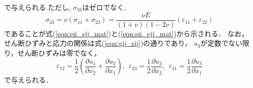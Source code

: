 \documentclass[10pt,a4j]{jbook}
\begin{document}
で与えられる.ただし, $\sigma_{33}$はゼロでなく,
\begin{equation}
	\sigma_{33}
	=\nu \left(\sigma_{11}+\sigma_{22}\right)
	=\frac{\nu E}{(1+\nu)(1-2\nu)}\left(\varepsilon_{11}+\varepsilon_{22}\right)
	\label{eqn:s33_pstrain}
\end{equation}
であることが式(\ref{eqn:eii_sjj_mat})と(\ref{eqn:sii_ejj_mat})から示される．
なお，せん断ひずみと応力の関係は式(\ref{eqn:gij_sij})の通りであり，
$u_3$が定数でない限り，せん断ひずみは零でなく，
\begin{equation}
	\varepsilon_{12}=\frac{1}{2}\left(
		\frac{\partial u_1}{\partial x_2} 
		+
		\frac{\partial u_2}{\partial x_1} 
	\right), \ \ 
	\varepsilon_{23}=\frac{1}{2}\frac{\partial u_3}{\partial x_2}, \ \  
	\varepsilon_{31}=\frac{1}{2}\frac{\partial u_3}{\partial x_1}
\end{equation}
で与えられる．
\end{document}
